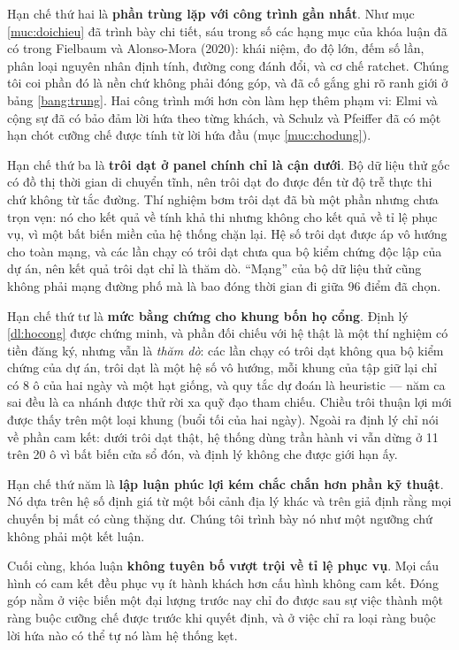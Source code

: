 Hạn chế thứ hai là \textbf{phần trùng lặp với công trình gần nhất}. Như mục \ref{muc:doichieu} đã trình bày chi
tiết, sáu trong số các hạng mục của khóa luận đã có trong Fielbaum và Alonso-Mora (2020): khái
niệm, đo độ lớn, đếm số lần, phân loại nguyên nhân định tính, đường cong đánh đổi, và cơ chế
ratchet. Chúng tôi coi phần đó là nền chứ không phải đóng góp, và đã cố gắng ghi rõ ranh giới ở
bảng \ref{bang:trung}. Hai công trình mới hơn còn làm hẹp thêm phạm vi: Elmi và cộng sự đã có bảo
đảm lời hứa theo từng khách, và Schulz và Pfeiffer đã có một hạn chót cưỡng chế được tính từ lời
hứa đầu (mục \ref{muc:chodung}).

Hạn chế thứ ba là \textbf{trôi dạt ở panel chính chỉ là cận dưới}. Bộ dữ liệu thử gốc có đồ thị
thời gian di chuyển tĩnh, nên trôi dạt đo được đến từ độ trễ thực thi chứ không từ tắc đường.
Thí nghiệm bơm trôi dạt đã bù một phần nhưng chưa trọn vẹn: nó cho kết quả về tính khả thi nhưng
không cho kết quả về tỉ lệ phục vụ, vì một bất biến miền của hệ thống chặn lại. Hệ số trôi dạt
được áp vô hướng cho toàn mạng, và các lần chạy có trôi dạt chưa qua bộ kiểm chứng độc lập của
dự án, nên kết quả trôi dạt chỉ là thăm dò. ``Mạng'' của bộ dữ liệu thử cũng không phải mạng đường
phố mà là bao đóng thời gian đi giữa 96 điểm đã chọn.

Hạn chế thứ tư là \textbf{mức bằng chứng cho khung bốn họ cổng}. Định lý \ref{dl:hocong} được
chứng minh, và phần đối chiếu với hệ thật là một thí nghiệm có tiền đăng ký, nhưng vẫn là
\emph{thăm dò}: các lần chạy có trôi dạt không qua bộ kiểm chứng của dự án, trôi dạt là một hệ số vô
hướng, mỗi khung của tập giữ lại chỉ có 8 ô của hai ngày và một hạt giống, và quy tắc dự đoán là
heuristic --- năm ca sai đều là ca nhánh được thử rời xa quỹ đạo tham chiếu. Chiều trôi thuận lợi
mới được thấy trên một loại khung (buổi tối của hai ngày). Ngoài ra định lý chỉ nói về phần cam kết: dưới trôi dạt thật,
hệ thống dùng trần hành vi vẫn dừng ở 11 trên 20 ô vì bất biến cửa sổ đón, và định lý không che
được giới hạn ấy.

Hạn chế thứ năm là \textbf{lập luận phúc lợi kém chắc chắn hơn phần kỹ thuật}. Nó dựa trên hệ số
định giá từ một bối cảnh địa lý khác và trên giả định rằng mọi chuyến bị mất có cùng thặng dư.
Chúng tôi trình bày nó như một ngưỡng chứ không phải một kết luận.

Cuối cùng, khóa luận \textbf{không tuyên bố vượt trội về tỉ lệ phục vụ}. Mọi cấu hình có cam
kết đều phục vụ ít hành khách hơn cấu hình không cam kết. Đóng góp nằm ở việc biến một đại
lượng trước nay chỉ đo được sau sự việc thành một ràng buộc cưỡng chế được trước khi quyết
định, và ở việc chỉ ra loại ràng buộc lời hứa nào có thể tự nó làm hệ thống kẹt.

